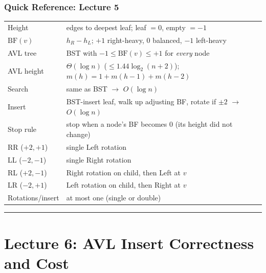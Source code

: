 \documentclass[11pt]{article}
\begin{document}
\section*{\textcolor{violetT}{Quick Reference: Lecture 5}}
\begin{keybox}
\renewcommand{\arraystretch}{1.4}
\begin{tabular}{l l}
Height & edges to deepest leaf; leaf $=0$, empty $=-1$\\
$\text{BF}(v)$ & $h_R - h_L$; \; $+1$ right-heavy, $0$ balanced, $-1$ left-heavy\\
AVL tree & BST with $-1 \leq \text{BF}(v) \leq +1$ for \emph{every} node\\
AVL height & $\Theta(\log n)$ \; ($\leq 1.44\log_2(n+2)$); \, $m(h)=1+m(h{-}1)+m(h{-}2)$\\
Search & same as BST $\to$ $O(\log n)$\\
Insert & BST-insert leaf, walk up adjusting BF, rotate if $\pm2$ $\to$ $O(\log n)$\\
Stop rule & stop when a node's BF becomes $0$ (its height did not change)\\
RR ($+2,+1$) & single Left rotation\\
LL ($-2,-1$) & single Right rotation\\
RL ($+2,-1$) & Right rotation on child, then Left at $v$\\
LR ($-2,+1$) & Left rotation on child, then Right at $v$\\
Rotations/insert & at most one (single or double)\\
\end{tabular}
\end{keybox}

\vspace{4pt}
\begin{center}\textcolor{greyline}{\rule{0.5\linewidth}{0.6pt}}\end{center}
\newpage


\part*{\textcolor{utnavy}{Lecture 6: AVL Insert Correctness and Cost}}
\setcounter{section}{0}
\end{document}

